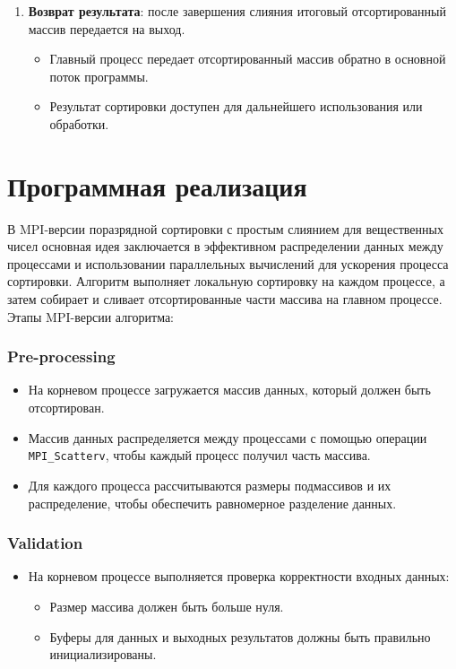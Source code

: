 \documentclass[12pt]{article}
\begin{document}
\begin{enumerate}
		\item \textbf{Возврат результата}: после завершения слияния итоговый отсортированный массив передается на выход.
		\begin{itemize}
			\item Главный процесс передает отсортированный массив обратно в основной поток программы.
			\item Результат сортировки доступен для дальнейшего использования или обработки.
		\end{itemize}
	\end{enumerate}
	
	\newpage
	
	\section*{Программная реализация}
	
	\hspace*{1.25em}В MPI-версии поразрядной сортировки с простым слиянием для вещественных чисел основная идея заключается в эффективном распределении данных между процессами и использовании параллельных вычислений для ускорения процесса сортировки. Алгоритм выполняет локальную сортировку на каждом процессе, а затем собирает и сливает отсортированные части массива на главном процессе. Этапы MPI-версии алгоритма:
	
	\subsubsection*{Pre-processing}
	\begin{itemize}
		\item На корневом процессе загружается массив данных, который должен быть отсортирован.
		\item Массив данных распределяется между процессами с помощью операции \texttt{MPI\_Scatterv}, чтобы каждый процесс получил часть массива.
		\item Для каждого процесса рассчитываются размеры подмассивов и их распределение, чтобы обеспечить равномерное разделение данных.
	\end{itemize}
	
	\subsubsection*{Validation}
	\begin{itemize}
		\item На корневом процессе выполняется проверка корректности входных данных:
		\begin{itemize}
			\item Размер массива должен быть больше нуля.
			\item Буферы для данных и выходных результатов должны быть правильно инициализированы.
		\end{itemize}
	\end{itemize}
	
\end{document}
